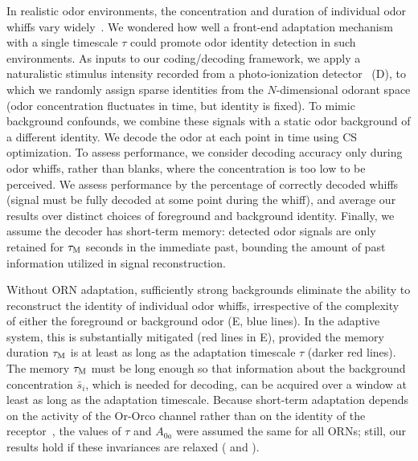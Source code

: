 \documentclass[9pt,lineno]{elife}
\begin{document}
In realistic odor environments, the concentration and duration of individual odor whiffs vary widely~\citep{celani}. We wondered how well a front-end adaptation mechanism with a single timescale $\tau$ could promote odor identity detection in such environments. {\color{blue} As inputs to our coding/decoding framework, we apply a naturalistic stimulus intensity recorded from a photo-ionization detector~\citep{srinivas_elife} (D), to which we randomly assign sparse identities from the $N$-dimensional odorant space (odor concentration fluctuates in time, but identity is fixed). To mimic background confounds, we combine these signals with a static odor background of a different identity. We decode the odor at each point in time using CS optimization. To assess performance, we consider decoding accuracy only during odor whiffs, rather than blanks, where the concentration is too low to be perceived. We assess performance by the percentage of correctly decoded whiffs (signal must be fully decoded at some point during the whiff), and average our results over distinct choices of foreground and background identity. } Finally, we assume the decoder has short-term memory: detected odor signals are only retained for $\tau_{\textup {M}}$ seconds in the immediate past, bounding the amount of past information utilized in signal reconstruction. 

Without ORN adaptation, sufficiently strong backgrounds eliminate the ability to reconstruct the identity of individual odor whiffs, irrespective of the complexity of either the foreground or background odor (E, blue lines). In the adaptive system, this is substantially mitigated (red lines in E), provided the memory duration $\tau_{\textup {M}}$ is at least as long as the adaptation timescale $\tau$ (darker red lines). {\color{blue} The memory $\tau_{\textup {M}}$ must be long enough so that information about the background concentration $\bar {s}_i$, which is needed for decoding, can be acquired over a window at least as long as the adaptation timescale. } Because short-term adaptation depends on the activity of the Or-Orco channel rather than on the identity of the receptor~\citep{nagel_wilson_biophysical,martelli,srinivas_elife}, the values of $\tau$ and $A_{0a}$ were assumed the same for all ORNs; still, our results hold if these invariances are relaxed ( and ). 
\end{document}
